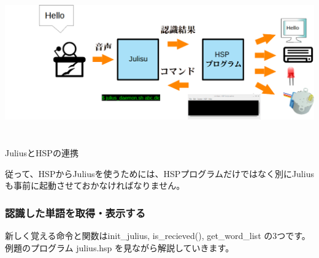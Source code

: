 \documentclass[a4paper,dvipdfmx]{jarticle}
\begin{document}
\centering
\includegraphics[width=17.006cm,height=6.332cm]{text06-img/text06-img010.png}
\caption[JuliusとHSPの連携]{\newline
JuliusとHSPの連携}
\label{seq:refIllustration10}

{
従って、HSPからJuliusを使うためには、HSPプログラムだけではなく別にJuliusも事前に起動させておかなければなりません。}

\subsubsection{認識した単語を取得・表示する}
{
新しく覚える命令と関数はinit\_julius, is\_recieved(),
get\_word\_list の3つです。例題のプログラム julius.hsp
を見ながら解説していきます。}
\end{document}
